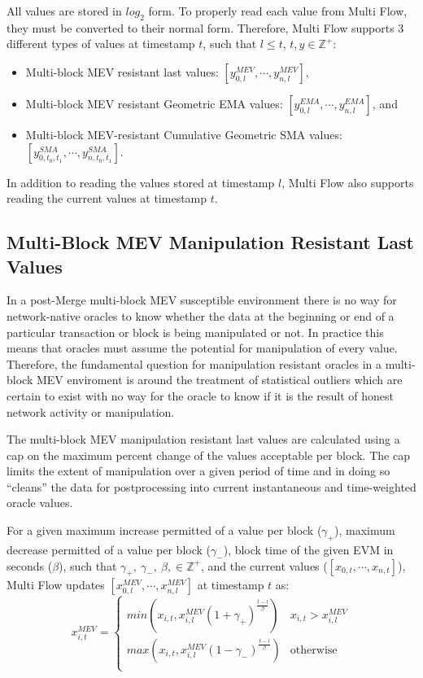 \documentclass[tikz]{article}
\begin{document}
All values are stored in $log_2$ form. To properly read each value from Multi Flow, they must be converted to their normal form. Therefore, Multi Flow supports 3 different types of values at timestamp $t$, such that $l \leq t$, $t, y \in \mathbb{Z}^{+}$:
\begin{itemize}
\item Multi-block MEV resistant last values: $[y^{MEV}_{0,l}, \cdots, y^{MEV}_{n,l}]$,
\item Multi-block MEV resistant Geometric EMA values: $[y^{EMA}_{0,l}, \cdots, y^{EMA}_{n,l}]$, and
\item Multi-block MEV-resistant Cumulative Geometric SMA values: $[y^{SMA}_{0,t_0,t_1}, \cdots, y^{SMA}_{n,t_0,t_1}]$.
\end{itemize}

In addition to reading the values stored at timestamp $l$, Multi Flow also supports reading the current values at timestamp $t$.

\subsection{Multi-Block MEV Manipulation Resistant Last Values}
In a post-Merge multi-block MEV susceptible environment there is no way for network-native oracles to know whether the data at the beginning or end of a particular transaction or block is being manipulated or not. In practice this means that oracles must assume the potential for manipulation of every value. Therefore, the fundamental question for manipulation resistant oracles in a multi-block MEV enviroment is around the treatment of statistical outliers which are certain to exist with no way for the oracle to know if it is the result of honest network activity or manipulation. 

The multi-block MEV manipulation resistant last values are calculated using a cap on the maximum percent change of the values acceptable per block. The cap limits the extent of manipulation over a given period of time and in doing so “cleans” the data for postprocessing into current instantaneous and time-weighted oracle values. 

For a given maximum increase permitted of a value per block ($\gamma_+$), maximum decrease permitted of a value per block ($\gamma_-$), block time of the given EVM in seconds ($\beta$), such that $\gamma_+,\ \gamma_-,\ \beta, \in \mathbb{Z}^{+}$, and the current values ($[x_{0,t}, \cdots, x_{n,t}]$), Multi Flow updates $[x^{MEV}_{0,l}, \cdots, x^{MEV}_{n,l}]$ at timestamp $t$ as:
$$
x^{MEV}_{i,t} = 
\begin{cases}
min\left(x_{i,t}, x^{MEV}_{i,l}(1+\gamma_+)^\frac{t-l}{\beta}\right) & x_{i,t} > x^{MEV}_{i,l} \\
max\left(x_{i,t}, x^{MEV}_{i,l}(1-\gamma_-)^\frac{t-l}{\beta}\right) & \text{otherwise} \\
\end{cases}
$$
\end{document}

